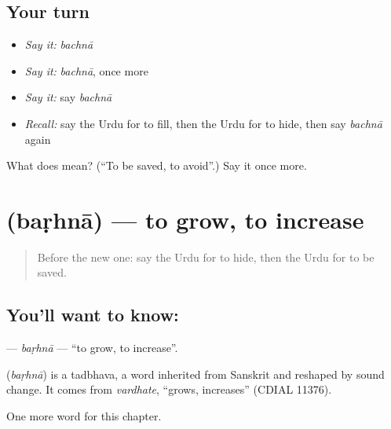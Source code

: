 \subsection*{Your turn}
\begin{itemize}
\raggedright
  \item \emph{Say it:} \emph{bachnā}
  \item \emph{Say it:} \emph{bachnā}, once more
  \item \emph{Say it:} say \emph{bachnā}
  \item \emph{Recall:} say the Urdu for to fill, then the Urdu for to hide, then say \emph{bachnā} again
\end{itemize}

\begin{tcolorbox}[breakable,colback=teal!4,colframe=teal!35!black,title={Before you move on}]
What does  mean? (\textquotedblleft{}To be saved, to avoid\textquotedblright{}.) Say it once more.
\end{tcolorbox}
\section[\texorpdfstring{\ur{بڑھنا} (baṛhnā)}{بڑھنا (baṛhnā)}]{ (baṛhnā) — to grow, to increase}

\label{lesson:UR-C142-barhna}



\begin{quote}
Before the new one: say the Urdu for to hide, then the Urdu for to be saved.
\end{quote}

\subsection*{You'll want to know: }
\textbf{} — \emph{baṛhnā} — \textquotedblleft{}to grow, to increase\textquotedblright{}.

\begin{cousinweb}
\textbf{} (\emph{baṛhnā}) is a tadbhava, a word inherited from Sanskrit and reshaped by sound change. It comes from \emph{vardhate}, \textquotedblleft{}grows, increases\textquotedblright{} (CDIAL 11376).
\end{cousinweb}

\begin{grammarlens}[title={What you've built}]
One more word for this chapter.
\end{grammarlens}

